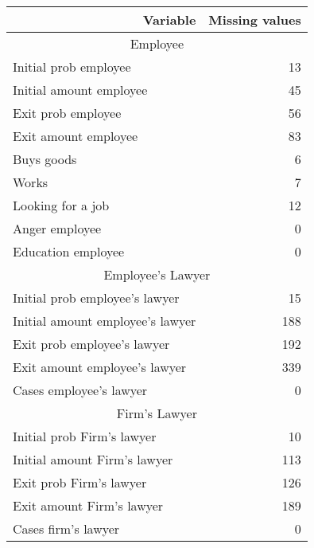 \begin{tabular}{rr}
\toprule
Variable & Missing values \\
\midrule
\multicolumn{2}{c}{Employee} \\
\midrule
\midrule
\multicolumn{1}{l}{Initial prob employee } & 13 \\
\multicolumn{1}{l}{Initial amount employee } & 45 \\
\multicolumn{1}{l}{Exit prob employee } & 56 \\
\multicolumn{1}{l}{Exit amount employee } & 83 \\
\multicolumn{1}{l}{Buys goods} & 6 \\
\multicolumn{1}{l}{Works} & 7 \\
\multicolumn{1}{l}{Looking for a job} & 12 \\
\multicolumn{1}{l}{Anger employee} & 0 \\
\multicolumn{1}{l}{Education employee} & 0 \\
\midrule
\multicolumn{2}{c}{Employee's Lawyer} \\
\midrule
\midrule
\multicolumn{1}{l}{Initial prob employee's lawyer} & 15 \\
\multicolumn{1}{l}{Initial amount employee's lawyer} & 188 \\
\multicolumn{1}{l}{Exit prob employee's lawyer} & 192 \\
\multicolumn{1}{l}{Exit amount employee's lawyer} & 339 \\
\multicolumn{1}{l}{Cases employee's lawyer} & 0 \\
\midrule
\multicolumn{2}{c}{Firm's Lawyer} \\
\midrule
\midrule
\multicolumn{1}{l}{Initial prob Firm's lawyer} & 10 \\
\multicolumn{1}{l}{Initial amount Firm's lawyer} & 113 \\
\multicolumn{1}{l}{Exit prob Firm's lawyer} & 126 \\
\multicolumn{1}{l}{Exit amount Firm's lawyer} & 189 \\
\multicolumn{1}{l}{Cases firm's lawyer} & 0 \\
\bottomrule
\end{tabular}%
